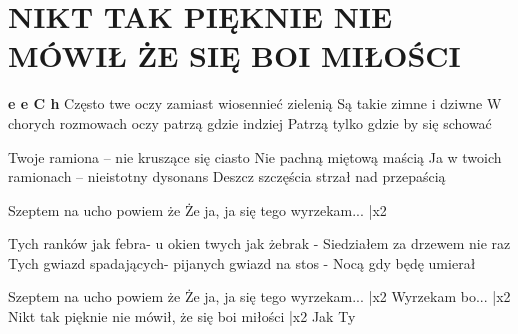 \documentclass[../../../songbook.tex]{subfiles}
\begin{document}
\TabPositions{9cm} %
\section*{NIKT TAK PIĘKNIE NIE MÓWIŁ ŻE SIĘ BOI MIŁOŚCI}
{}
\vspace{0.2cm}
{\color{red}\textbf{e e C h } } \newline
Często twe oczy zamiast wiosennieć zielenią		 \newline
Są takie zimne i dziwne							 \newline
W chorych rozmowach oczy patrzą gdzie indziej \newline
Patrzą tylko gdzie by się schować \newline

Twoje ramiona – nie kruszące się ciasto \newline
Nie pachną miętową maścią \newline
Ja w twoich ramionach – nieistotny dysonans \newline
Deszcz szczęścia strzał nad przepaścią \newline

\-\hspace{1cm} Szeptem na ucho powiem że		  \newline
\-\hspace{1cm} Że ja, ja się tego wyrzekam...	 |x2  \newline

Tych ranków jak febra- u okien twych jak żebrak - \newline
Siedziałem za drzewem nie raz \newline
Tych gwiazd spadających- pijanych gwiazd na stos - \newline
Nocą gdy będę umierał \newline

\-\hspace{1cm} Szeptem na ucho powiem że		  \newline
\-\hspace{1cm} Że ja, ja się tego wyrzekam...	 |x2  \newline
\-\hspace{1cm} Wyrzekam bo...				 |x2  \newline
\-\hspace{1cm} Nikt tak pięknie nie mówił, że się boi miłości	|x2  \newline
\-\hspace{1cm} Jak Ty \newline
\end{document}
